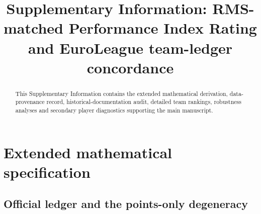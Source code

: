 \documentclass[pdflatex,sn-mathphys-num]{sn-jnl}
\begin{document}
\title[Supplementary Information]{Supplementary Information: RMS-matched Performance Index Rating and EuroLeague team-ledger concordance}
\author*[1]{ }
\author[1]{ }
\author[1]{ }
\affil*[1]{\orgdiv{[Department]}, \orgname{[Institution]}, \orgaddress{\city{[City]}, \postcode{[Postcode]}, \country{[Country]}}}

\begin{abstract}
This Supplementary Information contains the extended mathematical derivation, data-provenance record, historical-documentation audit, detailed team rankings, robustness analyses and secondary player diagnostics supporting the main manuscript.
\end{abstract}
\maketitle

\renewcommand{\thesection}{S\arabic{section}}
\renewcommand{\thesubsection}{S\arabic{section}.\arabic{subsection}}
\renewcommand{\thetable}{S\arabic{table}}
\renewcommand{\thefigure}{S\arabic{figure}}
\renewcommand{\theequation}{S\arabic{equation}}

\section{Extended mathematical specification}

\subsection{Official ledger and the points-only degeneracy}
\end{document}
